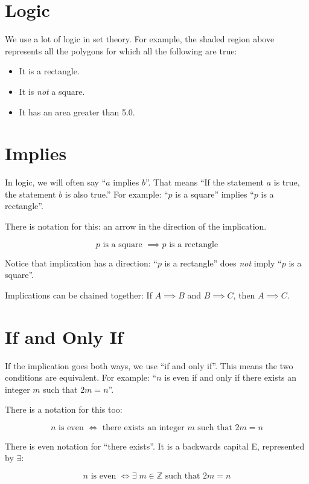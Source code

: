 \section{Logic}

We use a lot of logic in set theory.  For example, the shaded region
above represents all the polygons for which all the following are
true:
\begin{itemize}
\item It is a rectangle.
\item It is \textit{not} a square.
\item It has an area greater than 5.0.
\end{itemize}

\section{Implies}

In logic, we will often say ``$a$ implies $b$''.  That means ``If the
statement $a$ is true, the statement $b$ is also true.''  For example:
``$p$ is a square'' implies ``$p$ is a rectangle''.

There is notation for this: an arrow in the direction of the implication.

$$p \text{ is a square } \implies p \text{ is a rectangle}$$

Notice that implication has a direction: ``$p$ is a rectangle'' does \textit{not} imply 
``$p$ is a square''.

Implications can be chained together: If $A \implies B$ and $B \implies C$,  then $A \implies C$.

\section {If and Only If}

If the implication goes both ways, we use ``if and only if''.  This
means the two conditions are equivalent.  For example: ``$n$ is even
if and only if there exists an integer $m$ such that $2m = n$''. 

There is a notation for this too:

$$n \text{ is even } \iff \text{ there exists an integer } m \text{ such that } 2m = n$$

There is even notation for ``there exists''. It is a backwards capital E, represented by $\exists$:

$$n \text{ is even } \iff \exists \; m \in \mathbb{Z}  \text{ such that } 2m = n$$

